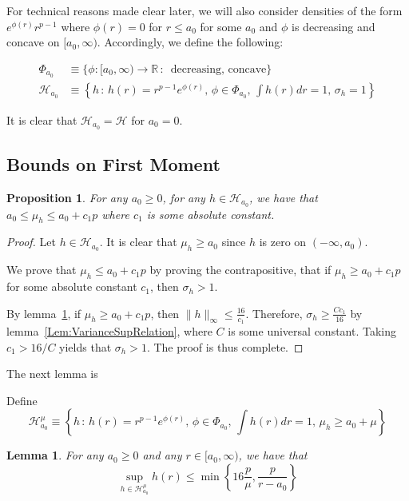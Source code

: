 \documentclass[12pt]{article}
\newtheorem{lemma}[theorem]{Lemma}
\newtheorem{proposition}[theorem]{Proposition}
\begin{document}
For technical reasons made clear later, we will also consider densities of the form $e^{\phi(r)}r^{p-1}$ where $\phi(r) = 0$ for $r \leq a_0$ for some $a_0$ and $\phi$ is decreasing and concave on $[a_0, \infty)$. Accordingly, we define the following:

\begin{align}
  \Phi_{a_0} &\equiv \{ \phi: [a_0, \infty) \rightarrow \mathbb{R} \,:\, \textrm{ decreasing, concave} \} \label{defn:Phi} \\
  \mathcal{H}_{a_0} &\equiv \left\{ h \,:\, h(r) = r^{p-1} e^{\phi(r)}, \, \phi \in \Phi_{a_0},\, \int h(r) dr = 1,\, \sigma_h = 1 \right\}
                 \label{defn:H_unit_variance_a0}
\end{align}

It is clear that $\mathcal{H}_{a_0} = \mathcal{H}$ for $a_0 = 0$.

\subsection{Bounds on First Moment}

\begin{proposition}
  For any $a_0 \geq 0$, for any $h \in \mathcal{H}_{a_0}$, we have that $a_0 \leq \mu_h \leq a_0 + c_1 p $ where $c_1$ is some absolute constant.
\end{proposition}

\begin{proof}

  Let $h \in \mathcal{H}_{a_0}$. It is clear that $\mu_h \geq a_0$ since $h$ is zero on $(-\infty, a_0)$.

  We prove that $\mu_h \leq a_0 + c_1p$ by proving the contrapositive, that if $\mu_h \geq a_0 + c_1 p$ for some absolute constant $c_1$, then $\sigma_h > 1$.

  By lemma~\ref{Lem:MeanConstrainedSupBound}, if $\mu_h \geq a_0 + c_1 p$, then $\| h \|_\infty \leq \frac{16}{c_1}$. Therefore, $\sigma_h \geq \frac{C c_1}{16}$ by lemma~\ref{Lem:VarianceSupRelation}, where $C$ is some universal constant. Taking $c_1 > 16/C$ 
  yields that $\sigma_h > 1$. The proof is thus complete.
\end{proof}


The next lemma is 

Define
\[
  \mathcal{H}_{a_0}^\mu \equiv
  \left\{ h \,:\, h(r) = r^{p-1} e^{\phi(r)}, \, \phi \in \Phi_{a_0},\, \int h(r) dr = 1,\, \mu_h \geq a_0 + \mu \right\}
\]

\begin{lemma}
  \label{Lem:MeanConstrainedSupBound}
For any $a_0 \geq 0$ and any $r \in [a_0, \infty)$, we have that
  \[
    \sup_{h \in \mathcal{H}_{a_0}^\mu } h(r) \leq
    \min\left\{ 16 \frac{p}{\mu}, \frac{p}{r - a_0} \right\}
  \]
  
\end{lemma}
\end{document}

